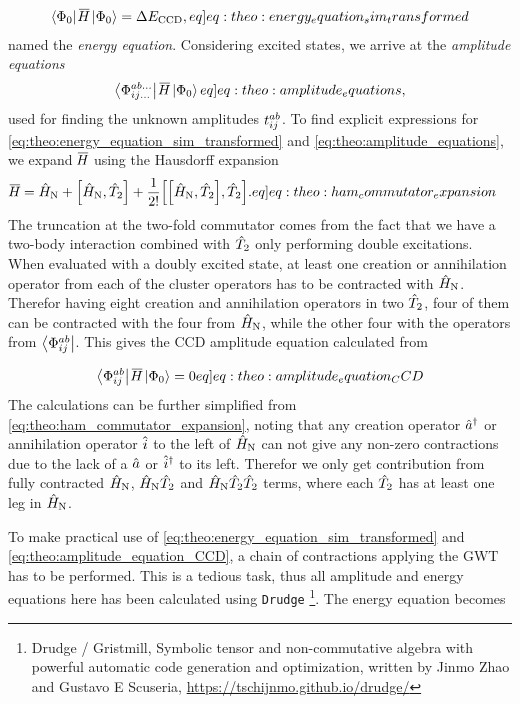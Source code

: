 \begin{align}
    \braansatz \simham \ketansatz = \DECCD, \label[eq]{eq:theo:energy_equation_sim_transformed}
\end{align}
named the \textit{energy equation}. Considering excited states, we arrive at the \textit{amplitude equations}
\begin{align}
    \braexed{ab\ldots}{ij\ldots} \simham \ketansatz \label[eq]{eq:theo:amplitude_equations},
\end{align}
used for finding the unknown amplitudes $t^{ab}_{ij}$. To find explicit expressions for \cref{eq:theo:energy_equation_sim_transformed} and \cref{eq:theo:amplitude_equations}, we expand $\overline{\mkern-1.9mu H\mkern-0.9mu}$ using the Hausdorff expansion
\begin{align}
    \simham &= \hamno + \commutator{\hamno}{\cluster{2}} + \frac{1}{2!}\commutator{\commutator{\hamno}{\cluster{2}}}{\cluster{2}}. \label[eq]{eq:theo:ham_commutator_expansion}
\end{align}
The truncation at the two-fold commutator comes from the fact that we have a two-body interaction combined with $\hat{T}_{2}$ only performing double excitations. When evaluated with a doubly excited state, at least one creation or annihilation operator from each of the cluster operators has to be contracted with $\hat{H}_\text{N}$. Therefor having eight creation and annihilation operators in two $\hat{T}_{2}$, four of them can be contracted with the four from $\hat{H}_\text{N}$, while the other four with the operators from $\bra{\Phi^{ab}_{ij}}$. This gives the CCD amplitude equation calculated from 

\begin{align}
    \braexed{ab}{ij}\simham\ketansatz = 0 \label[eq]{eq:theo:amplitude_equation_CCD}
\end{align}
The calculations can be further simplified from \cref{eq:theo:ham_commutator_expansion}, noting that any creation operator $\hat{a}^{\dagger}$ or annihilation operator $\hat{i}$ to the left of $\hat{H}_\text{N}$ can not give any non-zero contractions due to the lack of a $\hat{a}$ or $\hat{i}^{\dagger}$ to its left. Therefor we only get contribution from fully contracted $\hat{H}_\text{N}$, $\hat{H}_\text{N} \hat{T}_{2}$ and $\hat{H}_\text{N} \hat{T}_{2}\hat{T}_{2}$ terms, where each $\hat{T}_{2}$ has at least one leg in $\hat{H}_\text{N}$.  

To make practical use of \cref{eq:theo:energy_equation_sim_transformed} and \cref{eq:theo:amplitude_equation_CCD}, a chain of contractions applying the GWT has to be performed. This is a tedious task, thus all amplitude and energy equations here has been calculated using \verb|Drudge| \footnote{Drudge / Gristmill, Symbolic tensor and non-commutative algebra with powerful automatic code generation and optimization, written by Jinmo Zhao and Gustavo E Scuseria, \url{https://tschijnmo.github.io/drudge/}}. The energy equation becomes


